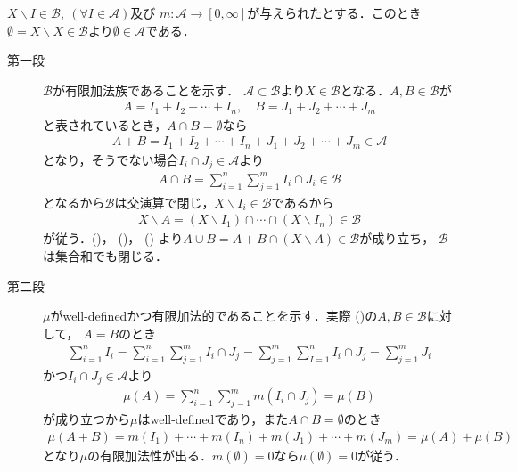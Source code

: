 		\begin{prf} $X \backslash I \in \mathcal{B},\ (\forall I \in \mathcal{A})$及び
			$m:\mathcal{A} \longrightarrow [0,\infty]$が与えられたとする．このとき
			$\emptyset = X \backslash X \in \mathcal{B}$より$\emptyset \in \mathcal{A}$である．
			\begin{description}
				\item[第一段]
					$\mathcal{B}$が有限加法族であることを示す．
					$\mathcal{A} \subset \mathcal{B}$より$X \in \mathcal{B}$となる．$A,B \in \mathcal{B}$が
					\begin{align}
						A = I_1 + I_2 + \cdots + I_n,
						\quad B = J_1 + J_2 + \cdots + J_m
						\label{eq:thm_forming_finitely_additive_class_4}
					\end{align}
					と表されているとき，$A \cap B = \emptyset$なら
					\begin{align}
						A + B = I_1 + I_2 + \cdots + I_n + J_1 + J_2 + \cdots + J_m \in \mathcal{A}
						\label{eq:thm_forming_finitely_additive_class_1}
					\end{align}
					となり，そうでない場合$I_i \cap J_j \in \mathcal{A}$より
					\begin{align}
						A \cap B = \sum_{i=1}^n\sum_{j=1}^m I_i \cap J_i \in \mathcal{B}
						\label{eq:thm_forming_finitely_additive_class_2}
					\end{align}
					となるから$\mathcal{B}$は交演算で閉じ，$X \backslash I_i \in \mathcal{B}$であるから
					\begin{align}
						X \backslash A = (X \backslash I_1) \cap \cdots \cap (X \backslash I_n) \in \mathcal{B}
						\label{eq:thm_forming_finitely_additive_class_3}
					\end{align}
					が従う．()，
					()，
					()
					より$A \cup B = A + B \cap (X \backslash A) \in \mathcal{B}$が成り立ち，
					$\mathcal{B}$は集合和でも閉じる．
		
				\item[第二段]
					$\mu$がwell-definedかつ有限加法的であることを示す．実際
					()の$A,B \in \mathcal{B}$に対して，
					$A = B$のとき
					\begin{align}
						\sum_{i=1}^n I_i = \sum_{i=1}^n \sum_{j=1}^m I_i \cap J_j 
						= \sum_{j=1}^m \sum_{I=1}^n I_i \cap J_j = \sum_{j=1}^m J_i
					\end{align}
					かつ$I_i \cap J_j \in \mathcal{A}$より
					\begin{align}
						\mu(A) = \sum_{i=1}^n \sum_{j=1}^m m(I_i \cap J_j) = \mu(B)
					\end{align}
					が成り立つから$\mu$はwell-definedであり，また$A \cap B = \emptyset$のとき
					\begin{align}
						\mu(A + B)
						=  m(I_1) + \cdots + m(I_n) + m(J_1) + \cdots + m(J_m)
						= \mu(A) + \mu(B)
					\end{align}
					となり$\mu$の有限加法性が出る．$m(\emptyset) = 0$なら$\mu(\emptyset) = 0$が従う．
					\QED
			\end{description}
		\end{prf}
		
